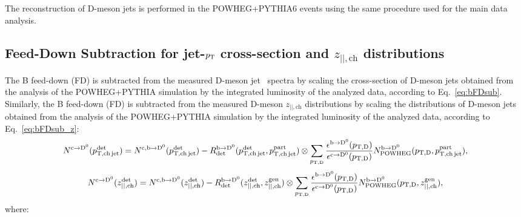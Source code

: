 The reconstruction of D-meson jets is performed in the POWHEG+PYTHIA6 events using the same procedure used for the main data analysis.

\subsection{Feed-Down Subtraction for jet-$p_{\text T}$ cross-section and $z_{||,\text{ch}}$ distributions}
The B feed-down (FD) is subtracted from the measured D-meson jet \pt\ spectra by scaling the cross-section of D-meson jets obtained from the analysis of the POWHEG+PYTHIA simulation by the integrated luminosity of the analyzed data, according to Eq.~\ref{eq:bFDsub}.
Similarly, the B feed-down (FD) is subtracted from the measured D-meson $z_{||,\text{ch}}$ distributions by scaling the distributions of D-meson jets obtained from the analysis of the POWHEG+PYTHIA simulation by the integrated luminosity of the analyzed data, according to Eq.~\ref{eq:bFDsub_z}:
\begin{equation}
N^{\rm c\rightarrow\mathrm{D^{0}}}(p_{\mathrm{T,ch\,jet}}^{\mathrm{det}}) = 
N^{\rm c,b\rightarrow\mathrm{D^{0}}}(p_{\mathrm{T,ch\,jet}}^{\mathrm{det}}) - 
R_{\rm det}^{\rm b\rightarrow\mathrm{D^{0}}}(p_{\mathrm{T,ch\,jet}}^{\mathrm{det}},p_{\mathrm{T,ch\,jet}}^{\mathrm{part}}) \otimes \sum_{p_{\mathrm{T,D}}} \frac{\epsilon^{\rm b\rightarrow\mathrm{D^{0}}}(p_{\mathrm{T,D}})}{\epsilon^{\rm c\rightarrow\mathrm{D^{0}}}(p_{\mathrm{T,D}})} N^{\rm b\rightarrow\mathrm{D^{0}}}_{\rm POWHEG}(p_{\mathrm{T,D}},p_{\mathrm{T,ch\,jet}}^{\mathrm{part}}),
\label{eq:bFDsub}
\end{equation}
\begin{equation}
N^{\rm c\rightarrow\mathrm{D^{0}}}(z_{||,\text{ch}}^{\text{det}}) = 
N^{\rm c,b\rightarrow\mathrm{D^{0}}}(z_{||,\text{ch}}^{\text{det}}) - 
R_{\rm det}^{\rm b\rightarrow\mathrm{D^{0}}}(z_{||,\text{ch}}^{\text{det}},z_{||,\text{ch}}^{\text{gen}}) \otimes \sum_{p_{\mathrm{T,D}}} \frac{\epsilon^{\rm b\rightarrow\mathrm{D^{0}}}(p_{\mathrm{T,D}})}{\epsilon^{\rm c\rightarrow\mathrm{D^{0}}}(p_{\mathrm{T,D}})} N^{\rm b\rightarrow\mathrm{D^{0}}}_{\rm POWHEG}(p_{\mathrm{T,D}},z_{||,\text{ch}}^{\text{gen}}),
\label{eq:bFDsub_z}
\end{equation}
where:
